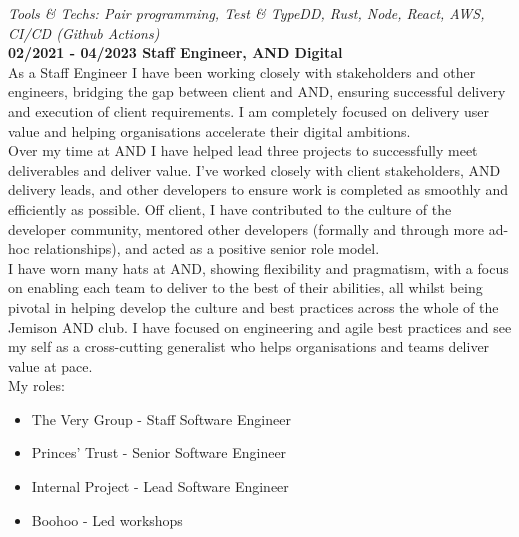 \bigskip

\emph{Tools \& Techs: Pair programming, Test \& TypeDD, Rust, Node, React, AWS, CI/CD (Github Actions)}\\

\textbf{02/2021 - 04/2023 \hspace{2.75em}Staff Engineer, AND Digital}\\

As a Staff Engineer I have been working closely with stakeholders and other engineers, bridging the gap between client and AND, ensuring successful delivery and execution of client requirements. I am completely focused on delivery user value and helping organisations accelerate their digital ambitions.\\

Over my time at AND I have helped lead three projects to successfully meet deliverables and deliver value. I’ve worked closely with client stakeholders, AND delivery leads, and other developers to ensure work is completed as smoothly and efficiently as possible. Off client, I have contributed to the culture of the developer community, mentored other developers (formally and through more ad-hoc relationships), and acted as a positive senior role model.\\

I have worn many hats at AND, showing flexibility and pragmatism, with a focus on enabling each team to deliver to the best of their abilities, all whilst being pivotal in helping develop the culture and best practices across the whole of the Jemison AND club. I have focused on engineering and agile best practices and see my self as a cross-cutting generalist who helps organisations and teams deliver value at pace.\\

My roles:\\

\begin{itemize}
  \item The Very Group   - Staff Software Engineer
  \item Princes' Trust   - Senior Software Engineer
  \item Internal Project - Lead Software Engineer
  \item Boohoo           - Led workshops
\end{itemize}

\bigskip

